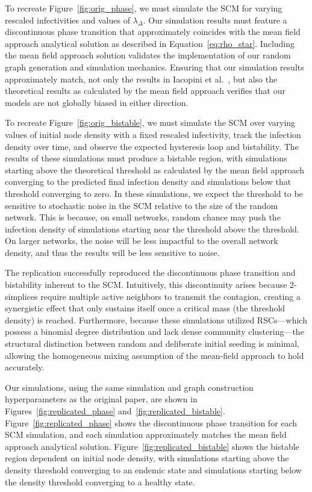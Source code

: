 \documentclass[sigconf]{acmart}
\begin{document}
To recreate Figure~\ref{fig:orig_phase}, we must simulate the SCM for varying rescaled infectivities and values of $\lambda_{\Delta}$. Our simulation results must feature a discontinuous phase transition that approximately coincides with the mean field approach analytical solution as described in Equation~\eqref{eq:rho_star}. Including the mean field approach solution validates the implementation of our random graph generation and simulation mechanics. Ensuring that our simulation results approximately match, not only the results in Iacopini et al.~\cite{iacopini2019}, but also the theoretical results as calculated by the mean field approach verifies that our models are not globally biased in either direction.

To recreate Figure~\ref{fig:orig_bistable}, we must simulate the SCM over varying values of initial node density with a fixed rescaled infectivity, track the infection density over time, and observe the expected hysteresis loop and bistability. The results of these simulations must produce a bistable region, with simulations starting above the theoretical threshold as calculated by the mean field approach converging to the predicted final infection density and simulations below that threshold converging to zero. In these simulations, we expect the threshold to be sensitive to stochastic noise in the SCM relative to the size of the random network. This is because, on small networks, random chance may push the infection density of simulations starting near the threshold above the threshold. On larger networks, the noise will be less impactful to the overall network density, and thus the results will be less sensitive to noise.

The replication successfully reproduced the discontinuous phase transition and bistability inherent to the SCM. Intuitively, this discontinuity arises because 2-simplices require multiple active neighbors to transmit the contagion, creating a synergistic effect that only sustains itself once a critical mass (the threshold density) is reached. Furthermore, because these simulations utilized RSCs---which possess a binomial degree distribution and lack dense community clustering---the structural distinction between random and deliberate initial seeding is minimal, allowing the homogeneous mixing assumption of the mean-field approach to hold accurately.

Our simulations, using the same simulation and graph construction hyperparameters as the original paper, are shown in Figures~\ref{fig:replicated_phase} and~\ref{fig:replicated_bistable}. Figure~\ref{fig:replicated_phase} shows the discontinuous phase transition for each SCM simulation, and each simulation approximately matches the mean field approach analytical solution. Figure~\ref{fig:replicated_bistable} shows the bistable region dependent on initial node density, with simulations starting above the density threshold converging to an endemic state and simulations starting below the density threshold converging to a healthy state.
\end{document}
